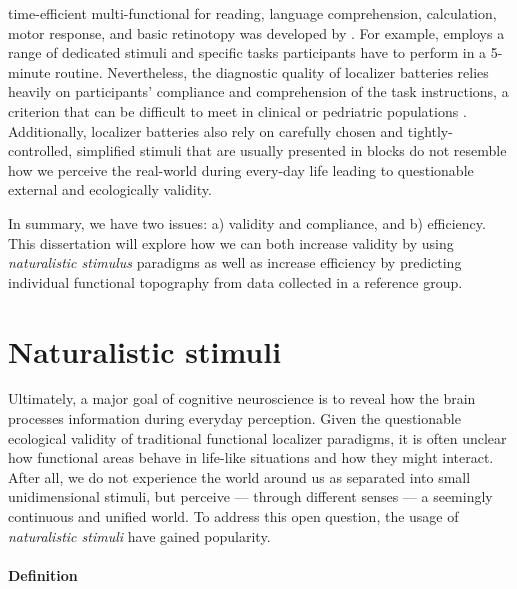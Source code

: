 time-efficient multi-functional  for reading,
language comprehension, calculation, motor response, and basic retinotopy was
developed by \citep{pinel2007fast, pinho2018individual,
pinho2020individual}.
For example, \citet{pinel2007fast} employs a range of dedicated stimuli and
specific tasks participants have to perform in a 5-minute routine.
Nevertheless, the diagnostic quality of localizer batteries relies heavily on
participants' compliance and comprehension of the task instructions, a criterion
that can be difficult to meet in clinical or pedriatric populations
\citep{eickhoff2020towards, vanderwal2015inscapes, vanderwal2019movies}.
Additionally, localizer batteries also rely on carefully chosen and
tightly-controlled, simplified stimuli that are usually presented in blocks do
not resemble how we perceive the real-world during every-day life leading to
questionable external and ecologically validity.

In summary, we have two issues: a) validity and compliance, and b) efficiency.
This dissertation will explore how we can both increase validity by using
\textit{naturalistic stimulus} paradigms as well as increase efficiency by
predicting individual functional topography from data collected in a reference
group.


\section{Naturalistic stimuli}

Ultimately, a major goal of cognitive neuroscience is to reveal how the brain
processes information during everyday perception.
%
Given the questionable ecological validity of traditional functional localizer
paradigms, it is often unclear how functional areas behave in life-like
situations and how they might interact.
%
After all, we do not experience the world around us as separated into small
unidimensional stimuli, but perceive --- through different senses --- a
seemingly continuous and unified world.
%
To address this open question, the usage of \textit{naturalistic
stimuli} have gained popularity.


\paragraph{Definition}

